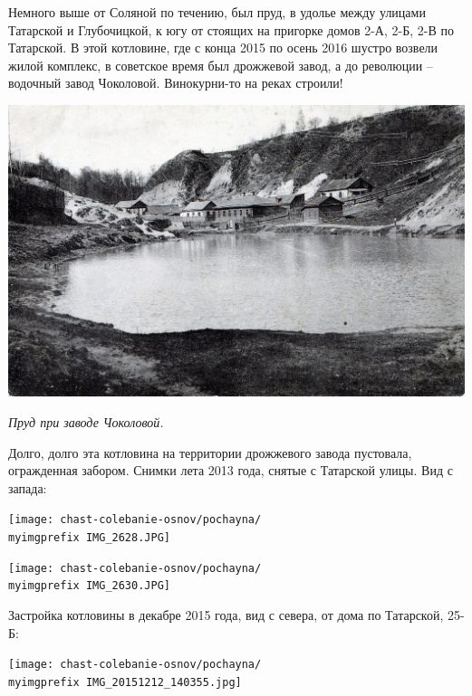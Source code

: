 Немного выше от Соляной по течению, был пруд, в удолье между улицами Татарской и Глубочицкой, к югу от стоящих на пригорке домов 2-А, 2-Б, 2-В по Татарской. В этой котловине, где с конца 2015 по осень 2016 шустро возвели жилой комплекс, в советское время был дрожжевой завод, а до революции – водочный завод Чоколовой. Винокурни-то на реках строили!
\vspace*{\fill}
\begin{center}
\includegraphics[width=\linewidth]{chast-colebanie-osnov/pochayna/tatarsk-stavok.jpg}

\textit{Пруд при заводе Чоколовой.}
\end{center}
\vspace*{\fill}
\newpage

Долго, долго эта котловина на территории дрожжевого завода пустовала, огражденная забором. Снимки лета 2013 года, снятые с Татарской улицы. Вид с запада: 

\begin{center}
\texttt{[image: chast-colebanie-osnov/pochayna/\\myimgprefix IMG\_2628.JPG]}
\end{center}

\begin{center}
\texttt{[image: chast-colebanie-osnov/pochayna/\\myimgprefix IMG\_2630.JPG]}
\end{center}

\newpage

Застройка котловины в декабре 2015 года, вид с севера, от дома по Татарской, 25-Б:

\begin{center}
\texttt{[image: chast-colebanie-osnov/pochayna/\\myimgprefix IMG\_20151212\_140355.jpg]}
\end{center}

